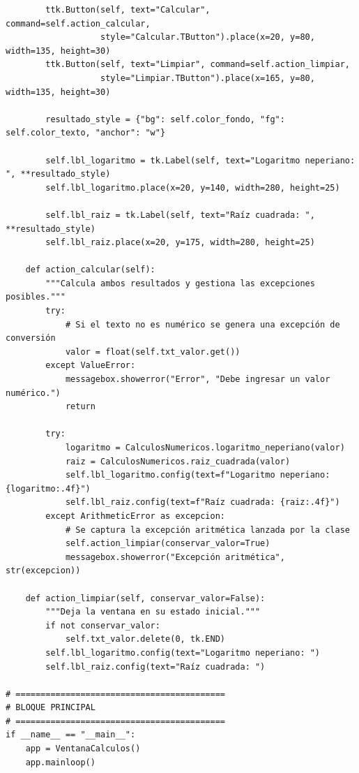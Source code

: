 \documentclass[11pt, a4paper]{article}
\begin{document}
\begin{lstlisting}
        ttk.Button(self, text="Calcular", command=self.action_calcular,
                   style="Calcular.TButton").place(x=20, y=80, width=135, height=30)
        ttk.Button(self, text="Limpiar", command=self.action_limpiar,
                   style="Limpiar.TButton").place(x=165, y=80, width=135, height=30)

        resultado_style = {"bg": self.color_fondo, "fg": self.color_texto, "anchor": "w"}

        self.lbl_logaritmo = tk.Label(self, text="Logaritmo neperiano: ", **resultado_style)
        self.lbl_logaritmo.place(x=20, y=140, width=280, height=25)

        self.lbl_raiz = tk.Label(self, text="Raíz cuadrada: ", **resultado_style)
        self.lbl_raiz.place(x=20, y=175, width=280, height=25)

    def action_calcular(self):
        """Calcula ambos resultados y gestiona las excepciones posibles."""
        try:
            # Si el texto no es numérico se genera una excepción de conversión
            valor = float(self.txt_valor.get())
        except ValueError:
            messagebox.showerror("Error", "Debe ingresar un valor numérico.")
            return

        try:
            logaritmo = CalculosNumericos.logaritmo_neperiano(valor)
            raiz = CalculosNumericos.raiz_cuadrada(valor)
            self.lbl_logaritmo.config(text=f"Logaritmo neperiano: {logaritmo:.4f}")
            self.lbl_raiz.config(text=f"Raíz cuadrada: {raiz:.4f}")
        except ArithmeticError as excepcion:
            # Se captura la excepción aritmética lanzada por la clase
            self.action_limpiar(conservar_valor=True)
            messagebox.showerror("Excepción aritmética", str(excepcion))

    def action_limpiar(self, conservar_valor=False):
        """Deja la ventana en su estado inicial."""
        if not conservar_valor:
            self.txt_valor.delete(0, tk.END)
        self.lbl_logaritmo.config(text="Logaritmo neperiano: ")
        self.lbl_raiz.config(text="Raíz cuadrada: ")

# ==========================================
# BLOQUE PRINCIPAL
# ==========================================
if __name__ == "__main__":
    app = VentanaCalculos()
    app.mainloop()
\end{lstlisting}

\newpage
\end{document}
